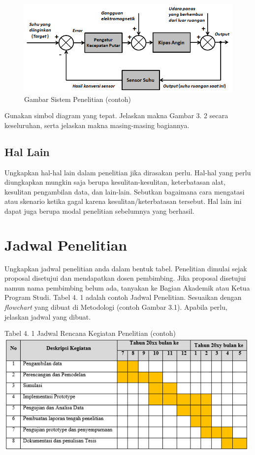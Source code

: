 \documentclass[12pt]{article}
\begin{document}
\begin{figure}[!ht]
\centering
 	\includegraphics[width=1\textwidth]{img-5.png}
 	\caption{Gambar Sistem Penelitian (contoh)}  
\end{figure}


Gunakan simbol diagram yang tepat. Jelaskan makna Gambar 3. 2 secara keseluruhan, serta jelaskan makna masing-masing bagiannya.



\subsection{Hal Lain}
Ungkapkan hal-hal lain dalam penelitian jika dirasakan perlu. Hal-hal yang perlu diungkapkan mungkin saja berupa kesulitan-kesulitan, keterbatasan alat, kesulitan pengambilan data, dan lain-lain. Sebutkan bagaimana cara mengatasi atau skenario ketika gagal karena kesulitan/keterbatasan tersebut. Hal lain ini dapat juga berupa modal penelitian sebelumnya yang berhasil.

\pagebreak{}


\section{Jadwal Penelitian}
Ungkapkan jadwal penelitian anda dalam bentuk tabel. Penelitian dimulai sejak proposal disetujui dan mendapatkan dosen pembimbing. Jika proposal disetujui namun nama pembimbing belum ada, tanyakan ke Bagian Akademik atau Ketua Program Studi. Tabel 4. 1 adalah contoh Jadwal Penelitian. Sesuaikan dengan \textit{flowchart} yang dibuat di Metodologi (contoh Gambar 3.1). Apabila perlu, jelaskan jadwal yang dibuat.

\begin{center}
Tabel 4. 1 Jadwal Rencana Kegiatan Penelitian (contoh)
\includegraphics[width=372pt]{img-6.png}
\end{center}


\pagebreak{}

\normalem


\end{document}
